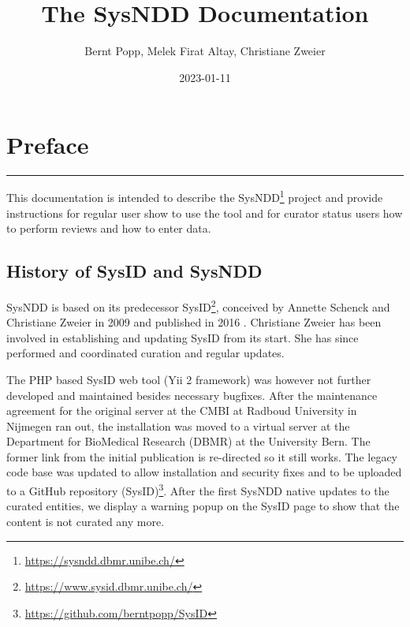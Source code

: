 \documentclass[
]{article}
\title{The SysNDD Documentation}
\author{Bernt Popp, Melek Firat Altay, Christiane Zweier}
\date{2023-01-11}
\renewcommand{\href}[2]{#2\footnote{\url{#1}}}
\begin{document}
\maketitle

{
\hypersetup{linkcolor=}
\setcounter{tocdepth}{2}
\tableofcontents
}
\hypertarget{preface}{%
\section*{Preface}\label{preface}}

\begin{center}\rule{0.5\linewidth}{0.5pt}\end{center}

This documentation is intended to describe the \href{https://sysndd.dbmr.unibe.ch/}{SysNDD} project and provide instructions for regular user show to use the tool and for curator status users how to perform reviews and how to enter data.

\hypertarget{history-of-sysid-and-sysndd}{%
\subsection*{History of SysID and SysNDD}\label{history-of-sysid-and-sysndd}}

SysNDD is based on its predecessor \href{https://www.sysid.dbmr.unibe.ch/}{SysID}, conceived by Annette Schenck and Christiane Zweier in 2009 and published in 2016 \citep{kochinke_systematic_2016}. Christiane Zweier has been involved in establishing and updating SysID from its start. She has since performed and coordinated curation and regular updates.

The PHP based SysID web tool (Yii 2 framework) was however not further developed and maintained besides necessary bugfixes. After the maintenance agreement for the original server at the CMBI at Radboud University in Nijmegen ran out, the installation was moved to a virtual server at the Department for BioMedical Research (DBMR) at the University Bern. The former link from the initial publication is re-directed so it still works. The legacy code base was updated to allow installation and security fixes and to be uploaded to a \href{https://github.com/berntpopp/SysID}{GitHub repository (SysID)}. After the first SysNDD native updates to the curated entities, we display a warning popup on the SysID page to show that the content is not curated any more.
\end{document}
